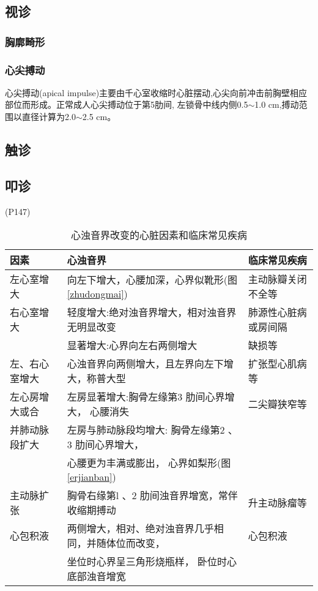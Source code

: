 \documentclass[UTF8]{ctexbook}
\begin{document}
\subsection{视诊}
\subsubsection{胸廓畸形}

\subsubsection{心尖搏动}
心尖搏动(apical impulse)主要由千心室收缩时心脏摆动,心尖向前冲击前胸壁相应部位而形成。正常成人心尖搏动位于第5肋间, 左锁骨中线内侧0.5$\sim$1.0 cm,搏动范围以直径计算为2.0$\sim$2.5 cm。
\subsection{触诊}
\subsection{叩诊}(P147)
\begin{table}[htbp]
    \caption{心浊音界改变的心脏因素和临床常见疾病}
    \begin{tabular}{lll}
        \hline
        因素           & 心浊音界                                             & 临床常见疾病         \\
        \hline
        左心室增大     & 向左下增大，心腰加深，心界似靴形(图\ref{zhudongmai}) & 主动脉瓣关闭不全等   \\
        右心室增大     & 轻度增大:绝对浊音界增大，相对浊音界无明显改变        & 肺源性心脏病或房间隔 \\
                       & 显著增大:心界向左右两侧增大                          & 缺损等               \\
        左、右心室增大 & 心浊音界向两侧增大，且左界向左下增大，称普大型       & 扩张型心肌病等       \\
        左心房增大或合 & 左房显著增大:胸骨左缘第3 肋间心界增大， 心腰消失     & 二尖瓣狭窄等         \\
        并肺动脉段扩大 & 左房与肺动脉段均增大: 胸骨左缘第2 、3 肋间心界增大， &                      \\
                       & 心腰更为丰满或膨出， 心界如梨形(图\ref{erjianban})   &                      \\
        主动脉扩张     & 胸骨右缘第l 、2 肋间浊音界增宽，常伴收缩期搏动       & 升主动脉瘤等         \\
        心包积液       & 两侧增大，相对、绝对浊音界几乎相同，并随体位而改变， & 心包积液             \\
                       & 坐位时心界呈三角形烧瓶样， 卧位时心底部浊音增宽      &                      \\
        \hline
    \end{tabular}
\end{table}
\end{document}
